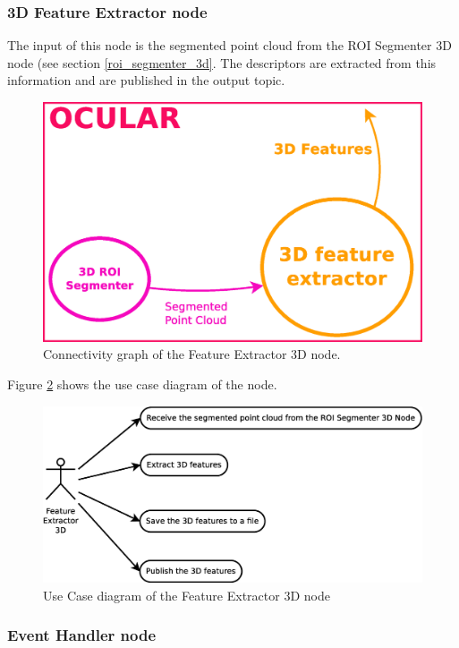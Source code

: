 
\subsubsection{3D Feature Extractor node}

	The input of this node is the segmented point cloud from the ROI Segmenter 3D node (see section \ref{roi_segmenter_3d}. The descriptors are extracted from this information and are published in the output topic. 
	\\
		\begin{figure}[H]
			\begin{center}
			\includegraphics[width=0.5\linewidth]{img/diagrams/node_fe3d.eps}
			\caption[Feature Extractor 3D node I/O]{Connectivity graph of the Feature Extractor 3D node.}		
			\label{node_fe3d}
			\end{center}
		\end{figure}

	Figure \ref{uc_fe3d} shows the use case diagram of the node. 

	\begin{figure}[H]
		\centering
			\includegraphics[scale=0.4]{img/diagrams/uc_feature_extractor_3d.eps}
			\caption[Use case diagram Feature Extractor 3D node]{Use Case diagram of the Feature Extractor 3D node}
		\label{uc_fe3d}
	\end{figure}


\subsubsection{Event Handler node}


